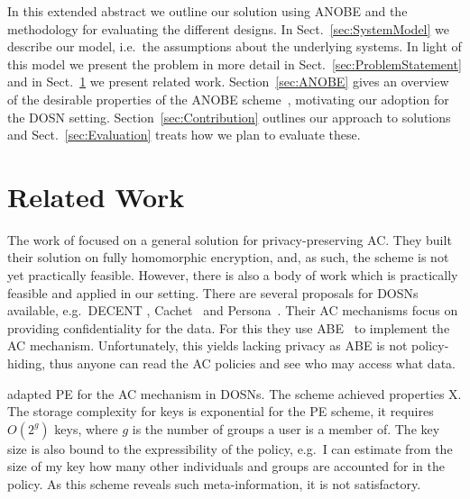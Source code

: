 In this extended abstract we outline our solution using \ac{ANOBE} and the 
methodology for evaluating the different designs.
In Sect.~\ref{sec:SystemModel} we describe our model, i.e.~the assumptions 
about the underlying systems.
In light of this model we present the problem in more detail in 
Sect.~\ref{sec:ProblemStatement} and in Sect.~\ref{sec:RelatedWork} we present 
related work.
Section~\ref{sec:ANOBE} gives an overview of the desirable properties of the 
\ac{ANOBE} scheme~\cite{anobe}, motivating our adoption for the \ac{DOSN} 
setting.
Section~\ref{sec:Contribution} outlines our approach to solutions and 
Sect.~\ref{sec:Evaluation} treats how we plan to evaluate these.


\section{Related Work}\label{sec:RelatedWork}
The work of \citet{TowardsPPACwHPHCHD} focused on a general solution for 
privacy-preserving \ac{AC}.
They built their solution on fully homomorphic encryption, and, as such, the 
scheme is not yet practically feasible.
However, there is also a body of work which is practically feasible and applied 
in our setting.
There are several proposals for \acp{DOSN} available, e.g.~DECENT
\cite{decent}, Cachet~\cite{cachet} and Persona~\cite{persona}.
Their \ac{AC} mechanisms focus on providing confidentiality for the 
data.
For this they use \ac{ABE}~\cite{abe} to implement the \ac{AC} mechanism.
Unfortunately, this yields lacking privacy as \ac{ABE} is not policy-hiding, 
thus anyone can read the \ac{AC} policies and see who may access what data.

\citet{predicateac} adapted \ac{PE} for the \ac{AC} mechanism in \acp{DOSN}.
The scheme achieved properties X.
The storage complexity for keys is exponential for the \ac{PE} scheme, it 
requires \(O(2^g)\) keys, where \(g\) is the number of groups a user is 
a member of.
The key size is also bound to the expressibility of the policy, e.g.\ I can 
estimate from the size of my key how many other individuals and groups are 
accounted for in the policy.
As this scheme reveals such meta-information, it is not satisfactory.

